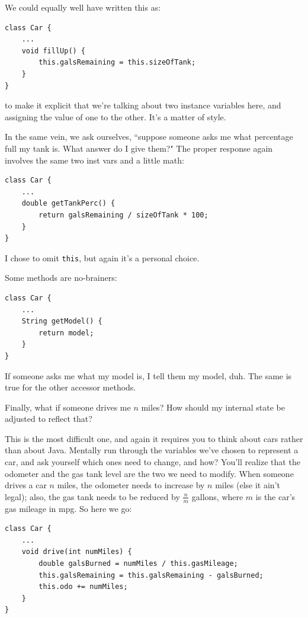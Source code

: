 We could equally well have written this as:

\begin{Verbatim}[samepage=true,fontsize=\footnotesize,frame=single]
class Car {
    ...
    void fillUp() {
        this.galsRemaining = this.sizeOfTank;
    }
}
\end{Verbatim}

to make it explicit that we're talking about two instance variables here, and
assigning the value of one to the other. It's a matter of style.

In the same vein, we ask ourselves, ``suppose someone asks me what percentage
full my tank is. What answer do I give them?" The proper response again
involves the same two inst vars and a little math:

\begin{Verbatim}[samepage=true,fontsize=\footnotesize,frame=single]
class Car {
    ...
    double getTankPerc() {
        return galsRemaining / sizeOfTank * 100;
    }
}
\end{Verbatim}

I chose to omit \texttt{this}, but again it's a personal choice.

Some methods are no-brainers:

\begin{Verbatim}[samepage=true,fontsize=\footnotesize,frame=single]
class Car {
    ...
    String getModel() {
        return model;
    }
}
\end{Verbatim}

If someone asks me what my model is, I tell them my model, duh. The same is
true for the other accessor methods.

Finally, what if someone drives me $n$ miles? How should my internal state
be adjusted to reflect that?

This is the most difficult one, and again it requires you to think about cars
rather than about Java. Mentally run through the variables we've chosen to
represent a car, and ask yourself which ones need to change, and how? You'll
realize that the odometer and the gas tank level are the two we need to
modify. When someone drives a car $n$ miles, the odometer needs to increase by
$n$ miles (else it ain't legal); also, the gas tank needs to be reduced by
$\frac{n}{m}$ gallons, where $m$ is the car's gas mileage in mpg. So here we
go:

\begin{Verbatim}[samepage=true,fontsize=\footnotesize,frame=single]
class Car {
    ...
    void drive(int numMiles) {
        double galsBurned = numMiles / this.gasMileage;
        this.galsRemaining = this.galsRemaining - galsBurned;
        this.odo += numMiles;
    }
}
\end{Verbatim}

